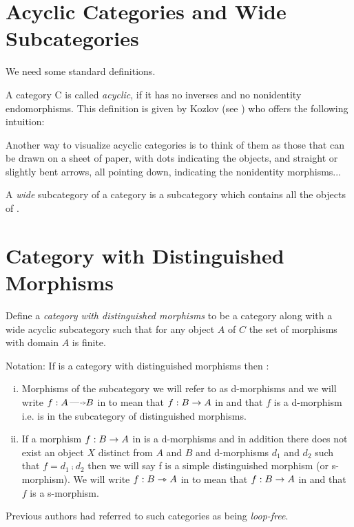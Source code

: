 \documentclass[10pt,a4paper]{scrartcl}
\begin{document}
\section {Acyclic Categories and Wide Subcategories}
We need some standard definitions.

A category C is called \textit{acyclic}, if it has no inverses and no nonidentity
endomorphisms. This definition is given by Kozlov (see \cite{Kozlov2007}) who offers the following intuition:
\begin{erquote}
Another way to visualize acyclic categories is to think of them as those
that can be drawn on a sheet of paper, with dots indicating the objects, and
straight or slightly bent arrows, all pointing down, indicating the nonidentity
morphisms...
\end{erquote}
\noindent
A \textit{wide} subcategory of a category  is a subcategory which contains all the objects of .

\section{Category with Distinguished Morphisms}

\begin{definition}
Define a \textit{category with distinguished morphisms} to be a category  along with a wide acyclic subcategory  such that for any object $A$ of $C$ the set of morphisms with domain $A$ is finite.
\end{definition} 

\noindent
Notation:
If  is a category with distinguished morphisms then :
\begin{enumerate}[(i)]
\item Morphisms of the subcategory we will refer to as d-morphisms and we will write  
$f: A \dmorph B$ in 
to mean that 
$f: B \rightarrow A$ in  and that $f$ is a d-morphism i.e. is in the subcategory  of distinguished morphisms. 
\item If a morphism $f: B \rightarrow A$ in  is a d-morphisms and in addition
there does not exist an object $X$ distinct from $A$ and $B$ and d-morphisms $d_1$ and $d_2$
such that $f=d_1 \comp d_2$ then we will say f is a simple distinguished morphism (or s-morphism). We will write  $f:B \rightarrowtriangle A$ in 
to mean that 
$f: B \rightarrow A$ in  and that $f$ is a s-morphism.
\end{enumerate}

\noindent
Previous authors had referred to such categories as being \textit{loop-free}. \\
\end{document}
